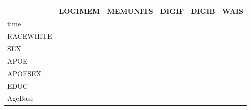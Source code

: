 \documentclass[
]{article}
\begin{document}
\begingroup\fontsize{7}{9}\selectfont

\begin{longtable}[t]{l|l|l|l|l|l}
\hline
  & LOGIMEM & MEMUNITS & DIGIF & DIGIB & WAIS\\
\hline
time & \cellcolor{green}{0.09 (0.04, 0.14)} & \cellcolor{green}{0.14 (0.09, 0.19)} & \cellcolor{white}{-0.02 (-0.07, 0.02)} & \cellcolor{red}{-0.06 (-0.11, -0.02)} & \cellcolor{red}{-0.08 (-0.11, -0.05)}\\
\hline
RACEWHITE & \cellcolor{green}{0.13 (0.09, 0.18)} & \cellcolor{green}{0.13 (0.09, 0.17)} & \cellcolor{white}{0.00 (-0.04, 0.04)} & \cellcolor{green}{0.06 (0.02, 0.10)} & \cellcolor{white}{0.01 (-0.01, 0.04)}\\
\hline
SEX & \cellcolor{green}{0.05 (0.01, 0.09)} & \cellcolor{white}{0.03 (-0.01, 0.07)} & \cellcolor{red}{-0.04 (-0.08, -0.01)} & \cellcolor{white}{-0.00 (-0.04, 0.03)} & \cellcolor{white}{0.01 (-0.01, 0.04)}\\
\hline
APOE & \cellcolor{white}{-0.01 (-0.07, 0.05)} & \cellcolor{white}{-0.04 (-0.10, 0.02)} & \cellcolor{white}{0.00 (-0.06, 0.06)} & \cellcolor{white}{0.00 (-0.06, 0.06)} & \cellcolor{white}{-0.00 (-0.05, 0.03)}\\
\hline
APOESEX & \cellcolor{white}{-0.06 (-0.13, 0.02)} & \cellcolor{white}{-0.00 (-0.07, 0.07)} & \cellcolor{white}{-0.01 (-0.08, 0.06)} & \cellcolor{white}{0.02 (-0.05, 0.08)} & \cellcolor{white}{-0.02 (-0.06, 0.03)}\\
\hline
EDUC & \cellcolor{green}{0.00 (0.00, 0.01)} & \cellcolor{green}{0.00 (0.00, 0.01)} & \cellcolor{white}{0.00 (-0.00, 0.00)} & \cellcolor{green}{0.00 (0.00, 0.01)} & \cellcolor{white}{0.00 (0.00, 0.00)}\\
\hline
AgeBase & \cellcolor{red}{-0.01 (-0.01, -0.01)} & \cellcolor{red}{-0.01 (-0.01, -0.01)} & \cellcolor{red}{-0.01 (-0.01, -0.00)} & \cellcolor{red}{-0.01 (-0.01, -0.01)} & \cellcolor{red}{-0.01 (-0.01, -0.01)}\\
\hline
\end{longtable}
\endgroup{}

\begingroup\fontsize{7}{9}\selectfont
\end{document}
